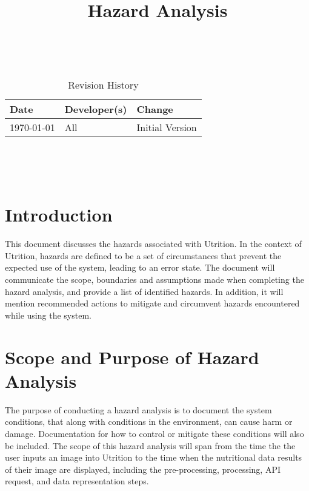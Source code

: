 \documentclass{article}
\title{Hazard Analysis\\\progname}
\author{\authname}
\date{}
\begin{document}
\maketitle
\thispagestyle{empty}

~\newpage


\begin{table}[hp]
	\caption{Revision History} \label{TblRevisionHistory}
	\begin{tabularx}{\textwidth}{llX}
		\toprule
		\textbf{Date} & \textbf{Developer(s)} & \textbf{Change}\\
		\midrule
		\today & All & Initial Version\\
		\bottomrule
	\end{tabularx}
\end{table}

~\newpage

\tableofcontents
\listoftables

~\newpage



\section{Introduction}

This document discusses the hazards associated with Utrition. In the context 
of Utrition, hazards are defined to be a set of circumstances that prevent 
the expected use of the system, leading to an error state. The document will 
communicate the scope, boundaries and assumptions made when completing the 
hazard analysis, and provide a list of identified hazards. In addition, it will 
mention recommended actions to mitigate and circumvent hazards encountered 
while using the system.

\section{Scope and Purpose of Hazard Analysis}
The purpose of conducting a hazard analysis is to document the system conditions, that along with conditions in the environment, can cause harm or damage. Documentation for how to control or mitigate these conditions will also be included. The scope of this hazard analysis will span from the time the the user inputs an image into Utrition to the time when the nutritional data results of their image are displayed, including the pre-processing, processing, API request, and data representation steps.
\end{document}

